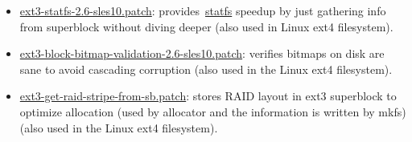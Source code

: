 \begin{itemize}
\item \url{ext3-statfs-2.6-sles10.patch}: provides~\url{statfs} speedup by just
gathering info from superblock without diving deeper (also used in Linux ext4
filesystem).

\item \url{ext3-block-bitmap-validation-2.6-sles10.patch}: verifies bitmaps on
disk are sane to avoid cascading corruption (also used in the Linux ext4 filesystem).

\item \url{ext3-get-raid-stripe-from-sb.patch}: stores RAID layout in ext3
superblock to optimize allocation (used by allocator and the information is
 written by mkfs) (also used in the Linux ext4 filesystem).

\end{itemize}
